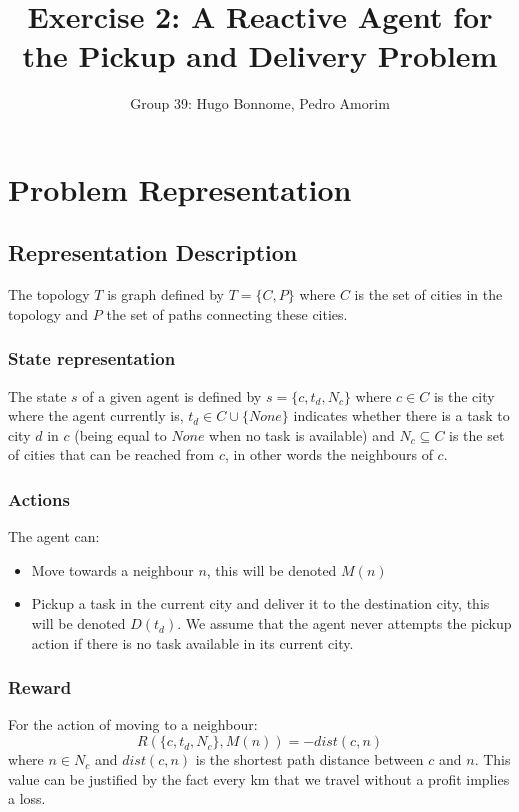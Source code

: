\documentclass[11pt]{article}
\title{\bf Exercise 2: A Reactive Agent for the Pickup and Delivery Problem}
\author{Group 39: Hugo Bonnome, Pedro Amorim}
\begin{document}
\maketitle

\section{Problem Representation}

\subsection{Representation Description}
The topology $T$ is graph defined by $T = \{C, P\}$ where $C$ is the set of cities
in the topology and $P$ the set of paths connecting these cities.
\subsubsection{State representation}
The state $s$ of a given agent is defined by $s = \{c, t_d, N_c\}$ where $c \in
C$ is the city where the agent currently is, $t_d \in C \cup \{None\}$ indicates
whether there is a task to city $d$ in $c$ (being equal to $None$ when no task
is available) and $N_c \subseteq C$ is the set of cities that can be reached
from $c$, in other words the neighbours of $c$.

\subsubsection{Actions}
The agent can:
\begin{itemize}
\item Move towards a neighbour $n$, this will be denoted $M(n)$

\item Pickup a task in the current city and deliver it to the destination city,
  this will be denoted $D(t_d)$. We assume that the agent never attempts the
  pickup action if there is no task available in its current city.
\end{itemize}

\subsubsection{Reward}
For the action of moving to a neighbour:
$$R(\{c, t_d, N_c\}, M(n)) = -dist(c, n)$$
where $n \in N_c$ and $dist(c,n)$ is the shortest path distance between $c$ and
$n$. This value can be justified by the fact every km that we travel without a
profit implies a loss.
\end{document}

